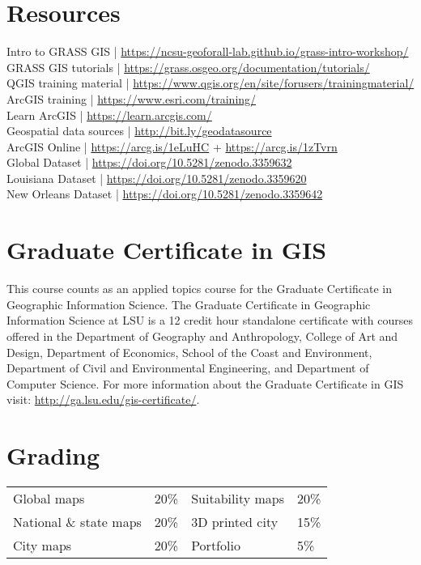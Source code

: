 \documentclass[11pt,article,oneside]{memoir}
\begin{document}
\section{Resources}
Intro to GRASS GIS | \url{https://ncsu-geoforall-lab.github.io/grass-intro-workshop/}\\
GRASS GIS tutorials | \url{https://grass.osgeo.org/documentation/tutorials/}\\
QGIS training material | \url{https://www.qgis.org/en/site/forusers/trainingmaterial/}\\
ArcGIS training | \url{https://www.esri.com/training/}\\
Learn ArcGIS | \url{https://learn.arcgis.com/}\\
Geospatial data sources | \url{http://bit.ly/geodatasource}\\
ArcGIS Online | \url{https://arcg.is/1eLuHC} + \url{https://arcg.is/1zTvrn}\\
Global Dataset | \url{https://doi.org/10.5281/zenodo.3359632}\\
Louisiana Dataset | \url{https://doi.org/10.5281/zenodo.3359620}\\
New Orleans Dataset | \url{https://doi.org/10.5281/zenodo.3359642}

\section{Graduate Certificate in GIS}
This course counts as an applied topics course for the 
Graduate Certificate in Geographic Information Science.
The Graduate Certificate in Geographic Information Science at LSU 
is a 12 credit hour standalone certificate
with courses offered 
in the Department of Geography and Anthropology, 
College of Art and Design, 
Department of Economics, 
School of the Coast and Environment, 
Department of Civil and Environmental Engineering, 
and Department of Computer Science. 
For more information about the Graduate Certificate in GIS visit: 
\url{http://ga.lsu.edu/gis-certificate/}.

\section{Grading}
%
\begin{table}[H]
\begin{tabular}{l r @{\hskip 2cm} l @{\hskip 0.5cm} l}
%
Global maps & 20\% & Suitability maps & 20\% \\
National \& state maps & 20\% & 3D printed city & 15\% \\
City maps & 20\% & Portfolio & 5\% \\
%
\end{tabular}
\end{table}
\end{document}
